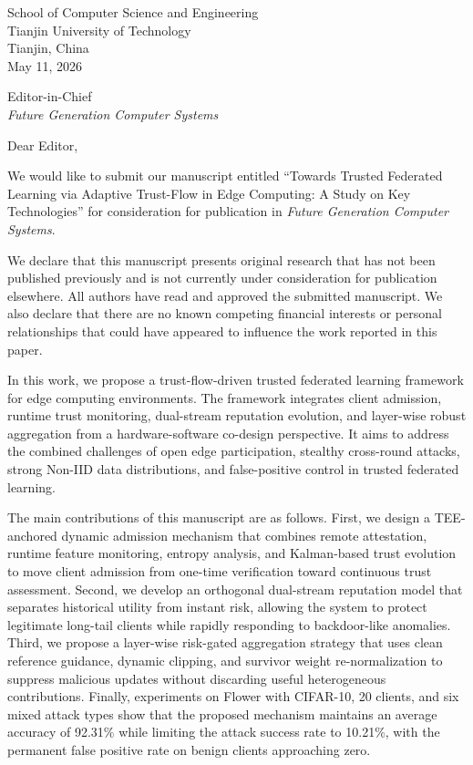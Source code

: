\documentclass[10pt]{article}
\begin{document}
\begin{flushright}
School of Computer Science and Engineering\\
Tianjin University of Technology\\
Tianjin, China\\
May 11, 2026
\end{flushright}

Editor-in-Chief\\
\textit{Future Generation Computer Systems}

Dear Editor,

We would like to submit our manuscript entitled ``Towards Trusted Federated Learning via Adaptive Trust-Flow in Edge Computing: A Study on Key Technologies'' for consideration for publication in \textit{Future Generation Computer Systems}.

We declare that this manuscript presents original research that has not been published previously and is not currently under consideration for publication elsewhere. All authors have read and approved the submitted manuscript. We also declare that there are no known competing financial interests or personal relationships that could have appeared to influence the work reported in this paper.

In this work, we propose a trust-flow-driven trusted federated learning framework for edge computing environments. The framework integrates client admission, runtime trust monitoring, dual-stream reputation evolution, and layer-wise robust aggregation from a hardware-software co-design perspective. It aims to address the combined challenges of open edge participation, stealthy cross-round attacks, strong Non-IID data distributions, and false-positive control in trusted federated learning.

The main contributions of this manuscript are as follows. First, we design a TEE-anchored dynamic admission mechanism that combines remote attestation, runtime feature monitoring, entropy analysis, and Kalman-based trust evolution to move client admission from one-time verification toward continuous trust assessment. Second, we develop an orthogonal dual-stream reputation model that separates historical utility from instant risk, allowing the system to protect legitimate long-tail clients while rapidly responding to backdoor-like anomalies. Third, we propose a layer-wise risk-gated aggregation strategy that uses clean reference guidance, dynamic clipping, and survivor weight re-normalization to suppress malicious updates without discarding useful heterogeneous contributions. Finally, experiments on Flower with CIFAR-10, 20 clients, and six mixed attack types show that the proposed mechanism maintains an average accuracy of 92.31\% while limiting the attack success rate to 10.21\%, with the permanent false positive rate on benign clients approaching zero.
\end{document}
